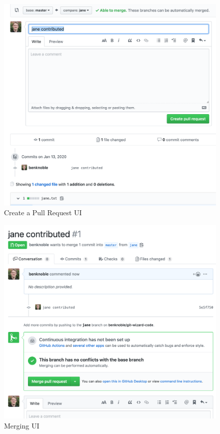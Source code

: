 \documentclass{beamer}
\theoremstyle{example}
\begin{document}
\begin{frame}
    \begin{figure}
        \includegraphics[scale=0.3]{img/new_pr}
        \caption{Create a Pull Request UI}
    \end{figure}
\end{frame}

\begin{frame}
    \begin{figure}
        \includegraphics[scale=0.3]{img/merging_pr}
        \caption{Merging UI}
    \end{figure}
\end{frame}
\end{document}
